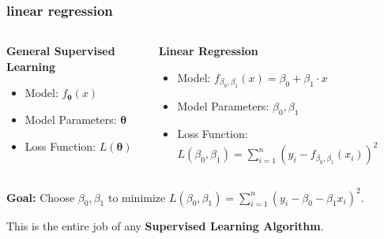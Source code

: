 \documentclass[handout,compress]{beamer}
\newcommand{\bs}[1]{\boldsymbol{#1}}
\begin{document}
\begin{frame}
	\frametitle{linear regression}
	\begin{columns}
		\begin{column}{.5\textwidth}
			\begin{center}
			\textbf{General Supervised Learning}
			\end{center}
	
			\begin{itemize}
				\item Model: $f_{\bs{\theta}}(x)$ \hspace{20em}
				\vspace{2em}
				\item Model Parameters: $\bs{\theta}$
				\vspace{2em}
				\item Loss Function: $L(\bs{\theta})$ \hspace{20em}
				\vspace{2em}
			\end{itemize}
		\end{column}
		\begin{column}{.5\textwidth}
			\begin{center}
				\textbf{Linear Regression}
			\end{center}
		
			\begin{itemize}
			\item Model: $f_{\beta_0,\beta_1}(x) = \beta_0 + \beta_1\cdot x$
			\vspace{2em}
			\item Model Parameters: $\beta_0, \beta_1$
			\vspace{2em}
			\item Loss Function: $L(\beta_0,\beta_1) = \sum_{i=1}^n (y_i - f_{\beta_0,\beta_1}(x_i))^2$ 
			\vspace{2em}
			\end{itemize}
		\end{column}
	\end{columns}
\vspace{-2em}

\begin{center}
	\textbf{Goal:} Choose $\beta_0,\beta_1$ to minimize $L(\beta_0,\beta_1) = \sum_{i=1}^n (y_i - \beta_0 - \beta_1x_i)^2$.
	
	This is the entire job of any \textbf{\alert{Supervised Learning Algorithm}}.
\end{center}
\end{frame}
\end{document}
